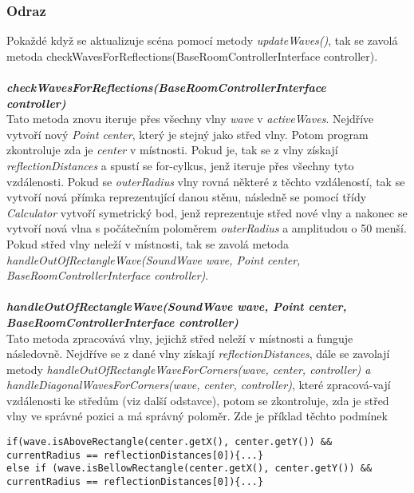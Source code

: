 \subsubsection{Odraz}
Pokaždé když se aktualizuje scéna pomocí metody \textit{updateWaves()}, tak se zavolá metoda checkWavesForReflections(BaseRoomControllerInterface controller).\\
\\
\textbf{\textit{checkWavesForReflections(BaseRoomControllerInterface\\
controller)}}\\
Tato metoda znovu iteruje přes všechny vlny \textit{wave} v \textit{activeWaves}.  Nejdříve vytvoří  nový \textit{Point center}, který je stejný jako střed vlny. Potom program zkontroluje zda je \textit{center} v místnosti. Pokud je, tak se z vlny získají \textit{reflectionDistances} a spustí se for-cylkus, jenž iteruje přes všechny tyto vzdálenosti. Pokud se \textit{outerRadius} vlny rovná některé z těchto vzdáleností, tak se vytvoří nová přímka reprezentující danou stěnu, následně se pomocí třídy \textit{Calculator} vytvoří symetrický bod, jenž reprezentuje střed nové vlny a nakonec se vytvoří nová vlna s počátečním poloměrem \textit{outerRadius} a amplitudou o 50 menší.\\
Pokud střed vlny neleží v místnosti, tak se zavolá metoda \textit{handleOutOfRectangleWave(SoundWave wave, Point center, BaseRoomControllerInterface controller)}.\\
\\
\textbf{\textit{\textit{handleOutOfRectangleWave(SoundWave wave, Point center, \\BaseRoomControllerInterface controller)}}}\\
Tato metoda zpracovává vlny, jejichž střed neleží v místnosti a funguje následovně.
Nejdříve se z dané vlny získají \textit{reflectionDistances}, dále se zavolají metody \textit{handleOutOfRectangleWaveForCorners(wave, center, controller) a handleDiagonalWavesForCorners(wave, center, controller)}, které zpracová-vají vzdálenosti ke středům (viz další odstavce), potom se zkontroluje, zda je střed vlny ve správné pozici a má správný poloměr. Zde je příklad těchto podmínek
\begin{verbatim}
if(wave.isAboveRectangle(center.getX(), center.getY()) &&
currentRadius == reflectionDistances[0]){...}
else if (wave.isBellowRectangle(center.getX(), center.getY()) &&
currentRadius == reflectionDistances[0]){...}
\end{verbatim}

